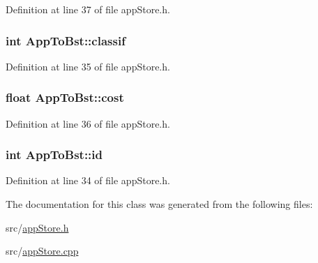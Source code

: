 Definition at line 37 of file app\-Store.\-h.

\hypertarget{class_app_to_bst_aae9b4fdc3556455b039841b11be18841}{
\subsubsection[{classif}]{\setlength{\rightskip}{0pt plus 5cm}int App\-To\-Bst\-::classif}}\label{class_app_to_bst_aae9b4fdc3556455b039841b11be18841}


Definition at line 35 of file app\-Store.\-h.

\hypertarget{class_app_to_bst_a96aa8eb927a45e1cb3b704e7d6769ed7}{
\subsubsection[{cost}]{\setlength{\rightskip}{0pt plus 5cm}float App\-To\-Bst\-::cost}}\label{class_app_to_bst_a96aa8eb927a45e1cb3b704e7d6769ed7}


Definition at line 36 of file app\-Store.\-h.

\hypertarget{class_app_to_bst_af25693604a7f39c2848d750f76408587}{
\subsubsection[{id}]{\setlength{\rightskip}{0pt plus 5cm}int App\-To\-Bst\-::id}}\label{class_app_to_bst_af25693604a7f39c2848d750f76408587}


Definition at line 34 of file app\-Store.\-h.



The documentation for this class was generated from the following files\-:\begin{DoxyCompactItemize}
\item 
src/\hyperlink{app_store_8h}{app\-Store.\-h}\item 
src/\hyperlink{app_store_8cpp}{app\-Store.\-cpp}\end{DoxyCompactItemize}
